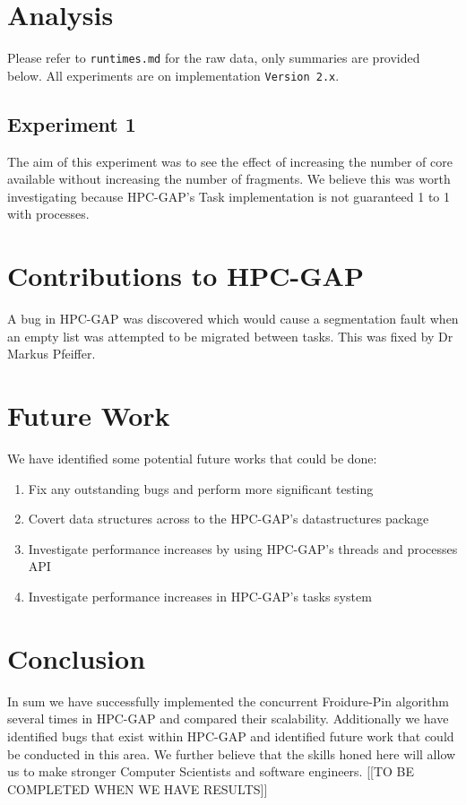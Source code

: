\documentclass{report}
\begin{document}
\section*{Analysis}
Please refer to \texttt{runtimes.md} for the raw data, only summaries are provided below.
\newline
All experiments are on implementation \texttt{Version 2.x}.

\subsection*{Experiment 1}
The aim of this experiment was to see the effect of increasing the number of core available without increasing the number of fragments.
\newline
We believe this was worth investigating because HPC-GAP's Task implementation is not guaranteed 1 to 1 with processes.
\newline

\section*{Contributions to HPC-GAP}
A bug in HPC-GAP was discovered which would cause a segmentation fault when an empty list was attempted to be migrated between tasks.
This was fixed by Dr Markus Pfeiffer\cite{hpcsol}.

\section*{Future Work}
We have identified some potential future works that could be done:

\begin{enumerate}
\item Fix any outstanding bugs and perform more significant testing
\item Covert data structures across to the HPC-GAP's datastructures package\cite{ds}
\item Investigate performance increases by using HPC-GAP's threads and processes API
\item Investigate performance increases in HPC-GAP's tasks system
\end{enumerate}

\section*{Conclusion}
In sum we have successfully implemented the concurrent Froidure-Pin algorithm several times in HPC-GAP and compared their scalability.
Additionally we have identified bugs that exist within HPC-GAP and identified future work that could be conducted in this area.
\newline
We further believe that the skills honed here will allow us to make stronger Computer Scientists and software engineers.
[[TO BE COMPLETED WHEN WE HAVE RESULTS]]



\end{document}
